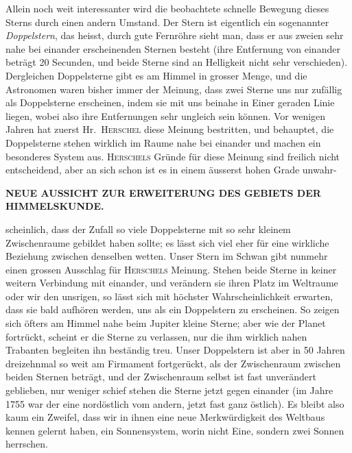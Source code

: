 Allein noch weit interessanter wird die beobachtete schnelle Bewegung dieses Sterns durch einen andern Umstand. Der Stern ist eigentlich ein sogenannter \emph{Doppelstern}, das heisst, durch gute Fernröhre sieht man, dass er aus zweien sehr nahe bei einander erscheinenden Sternen besteht (ihre Entfernung von einander beträgt 20 Secunden, und beide Sterne sind an Helligkeit nicht sehr verschieden). Dergleichen Doppelsterne gibt es am Himmel in grosser Menge, und die Astronomen waren bisher immer der Meinung, dass zwei Sterne uns nur zufällig als Doppelsterne erscheinen, indem sie mit uns beinahe in Einer geraden Linie liegen, wobei also ihre Entfernungen sehr ungleich sein können. Vor wenigen Jahren hat zuerst Hr.\ \textsc{Herschel} diese Meinung bestritten, und behauptet, die Doppelsterne stehen wirklich im Raume nahe bei einander und machen ein besonderes System aus. \textsc{Herschels} Gründe für diese Meinung sind freilich nicht entscheidend, aber an sich schon ist es in einem äusserst hohen Grade unwahr-
\par\clearpage
\endgroup
\clearpage
\thispagestyle{empty}
\noindent{}%
%
\parbox[t]{\dimexpr\linewidth-20mm\relax}{\centering\fontsize{7}{8.5}\selectfont\bfseries NEUE AUSSICHT ZUR ERWEITERUNG DES GEBIETS DER HIMMELSKUNDE.\par}%
\makebox[10mm][r]{}\par\nobreak\medskip
\noindent scheinlich, dass der Zufall so viele Doppelsterne mit so sehr kleinem Zwischenraume gebildet haben sollte; es lässt sich viel eher für eine wirkliche Beziehung zwischen denselben wetten. Unser Stern im Schwan gibt nunmehr einen grossen Ausschlag für \textsc{Herschels} Meinung. Stehen beide Sterne in keiner weitern Verbindung mit einander, und verändern sie ihren Platz im Weltraume oder wir den unsrigen, so lässt sich mit höchster Wahrscheinlichkeit erwarten, dass sie bald aufhören werden, uns als ein Doppelstern zu erscheinen. So zeigen sich öfters am Himmel nahe beim Jupiter kleine Sterne; aber wie der Planet fortrückt, scheint er die Sterne zu verlassen, nur die ihm wirklich nahen Trabanten begleiten ihn beständig treu. Unser Doppelstern ist aber in 50 Jahren dreizehnmal so weit am Firmament fortgerückt, als der Zwischenraum zwischen beiden Sternen beträgt, und der Zwischenraum selbst ist fast unverändert geblieben, nur weniger schief stehen die Sterne jetzt gegen einander (im Jahre 1755 war der eine nordöstlich vom andern, jetzt fast ganz östlich). Es bleibt also kaum ein Zweifel, dass wir in ihnen eine neue Merkwürdigkeit des Weltbaus kennen gelernt haben, ein Sonnensystem, worin nicht Eine, sondern zwei Sonnen herrschen.

